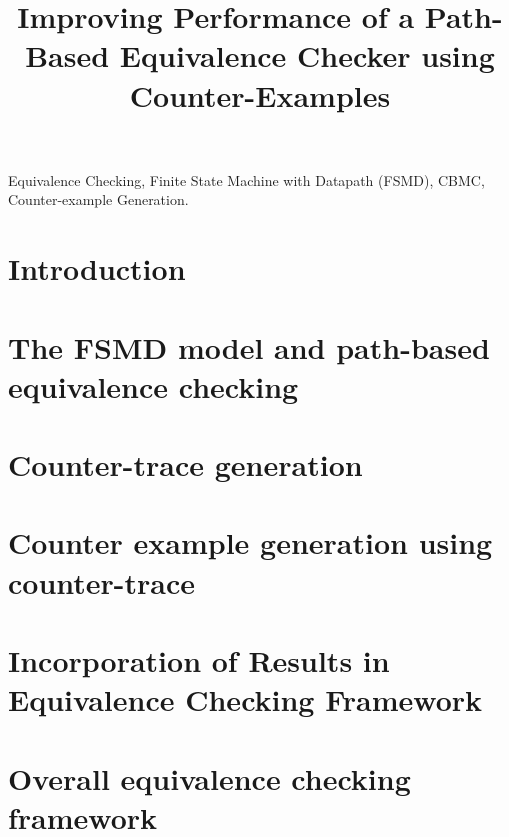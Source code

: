 \documentclass[conference,10pt]{IEEEtran}
\begin{document}
 
\title{Improving Performance of a Path-Based Equivalence Checker using Counter-Examples}
\author{
}
\maketitle 
\begin{abstract}  

\end{abstract}
\begin{IEEEkeywords} Equivalence Checking, Finite State Machine with Datapath (FSMD), CBMC, Counter-example Generation.  
\end{IEEEkeywords}
\IEEEpeerreviewmaketitle
\section{Introduction}\label{Sec:intro}

\section{The FSMD model and path-based equivalence checking}\label{Sec:prelim}


\section{Counter-trace generation \label{Sec:CTrace}}

\section{Counter example generation using counter-trace\label{Sec:CE}}



\section{Incorporation of Results in Equivalence Checking Framework\label{Sec:incorpoResult}}

\section{Overall equivalence checking framework\label{Sec:EVP+CE}}
 
 

\end{document}
